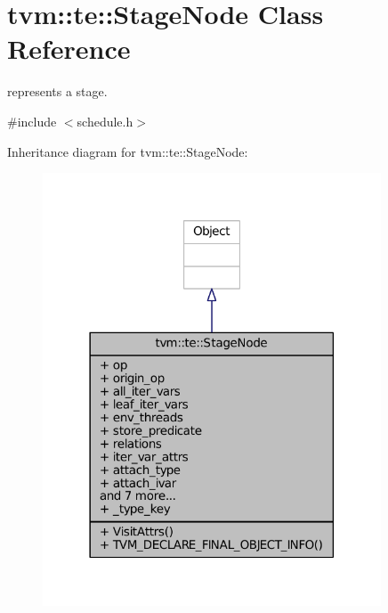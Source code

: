 \hypertarget{classtvm_1_1te_1_1StageNode}{}\section{tvm\+:\+:te\+:\+:Stage\+Node Class Reference}
\label{classtvm_1_1te_1_1StageNode}


represents a stage.  




{\ttfamily \#include $<$schedule.\+h$>$}



Inheritance diagram for tvm\+:\+:te\+:\+:Stage\+Node\+:
\nopagebreak
\begin{figure}[H]
\begin{center}
\leavevmode
\includegraphics[width=285pt]{classtvm_1_1te_1_1StageNode__inherit__graph}
\end{center}
\end{figure}


